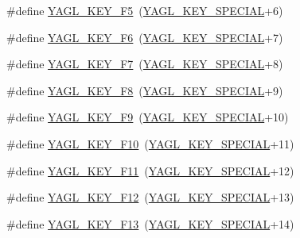\begin{DoxyCompactItemize}
\item 
\#define \hyperlink{group____consts__key__mouse_ga8862c2013ff868c41f4d55bb55003f6d}{Y\-A\-G\-L\-\_\-\-K\-E\-Y\-\_\-\-F5}~(\hyperlink{group____consts__key__mouse_gae6060c5e0a8f15c67d28e1a1f0765d7b}{Y\-A\-G\-L\-\_\-\-K\-E\-Y\-\_\-\-S\-P\-E\-C\-I\-A\-L}+6)
\item 
\#define \hyperlink{group____consts__key__mouse_gaa2903384227eb1058ce6710028241e9c}{Y\-A\-G\-L\-\_\-\-K\-E\-Y\-\_\-\-F6}~(\hyperlink{group____consts__key__mouse_gae6060c5e0a8f15c67d28e1a1f0765d7b}{Y\-A\-G\-L\-\_\-\-K\-E\-Y\-\_\-\-S\-P\-E\-C\-I\-A\-L}+7)
\item 
\#define \hyperlink{group____consts__key__mouse_gaa5723014f04383e8dbd199137f68b77c}{Y\-A\-G\-L\-\_\-\-K\-E\-Y\-\_\-\-F7}~(\hyperlink{group____consts__key__mouse_gae6060c5e0a8f15c67d28e1a1f0765d7b}{Y\-A\-G\-L\-\_\-\-K\-E\-Y\-\_\-\-S\-P\-E\-C\-I\-A\-L}+8)
\item 
\#define \hyperlink{group____consts__key__mouse_ga40f3ab5496014a157a5ca7cb980ca9d0}{Y\-A\-G\-L\-\_\-\-K\-E\-Y\-\_\-\-F8}~(\hyperlink{group____consts__key__mouse_gae6060c5e0a8f15c67d28e1a1f0765d7b}{Y\-A\-G\-L\-\_\-\-K\-E\-Y\-\_\-\-S\-P\-E\-C\-I\-A\-L}+9)
\item 
\#define \hyperlink{group____consts__key__mouse_gafe922de6efbe0ee010bac8d4b3dfcd02}{Y\-A\-G\-L\-\_\-\-K\-E\-Y\-\_\-\-F9}~(\hyperlink{group____consts__key__mouse_gae6060c5e0a8f15c67d28e1a1f0765d7b}{Y\-A\-G\-L\-\_\-\-K\-E\-Y\-\_\-\-S\-P\-E\-C\-I\-A\-L}+10)
\item 
\#define \hyperlink{group____consts__key__mouse_ga6c3e922e13a6ba24b254d44f2d0e7f86}{Y\-A\-G\-L\-\_\-\-K\-E\-Y\-\_\-\-F10}~(\hyperlink{group____consts__key__mouse_gae6060c5e0a8f15c67d28e1a1f0765d7b}{Y\-A\-G\-L\-\_\-\-K\-E\-Y\-\_\-\-S\-P\-E\-C\-I\-A\-L}+11)
\item 
\#define \hyperlink{group____consts__key__mouse_ga15c11d2e44ddef7ed984094a0f6d7175}{Y\-A\-G\-L\-\_\-\-K\-E\-Y\-\_\-\-F11}~(\hyperlink{group____consts__key__mouse_gae6060c5e0a8f15c67d28e1a1f0765d7b}{Y\-A\-G\-L\-\_\-\-K\-E\-Y\-\_\-\-S\-P\-E\-C\-I\-A\-L}+12)
\item 
\#define \hyperlink{group____consts__key__mouse_ga8347f27b3d9d5b8c6c40f78599fc3b27}{Y\-A\-G\-L\-\_\-\-K\-E\-Y\-\_\-\-F12}~(\hyperlink{group____consts__key__mouse_gae6060c5e0a8f15c67d28e1a1f0765d7b}{Y\-A\-G\-L\-\_\-\-K\-E\-Y\-\_\-\-S\-P\-E\-C\-I\-A\-L}+13)
\item 
\#define \hyperlink{group____consts__key__mouse_gad4b2170cc9685017e512a50f5da56e2b}{Y\-A\-G\-L\-\_\-\-K\-E\-Y\-\_\-\-F13}~(\hyperlink{group____consts__key__mouse_gae6060c5e0a8f15c67d28e1a1f0765d7b}{Y\-A\-G\-L\-\_\-\-K\-E\-Y\-\_\-\-S\-P\-E\-C\-I\-A\-L}+14)

\end{DoxyCompactItemize}
